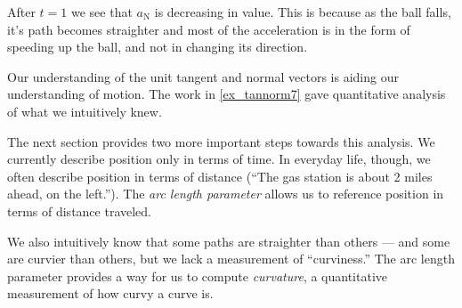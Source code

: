 \begin{example}
After $t=1$ we see that $a_\mathrm{N}$ is decreasing in value. This is because as the ball falls, it's path becomes straighter and most of the acceleration is in the form of speeding up the ball, and not in changing its direction.
\end{example}

Our understanding of the unit tangent and normal vectors is aiding our understanding of motion. The work in \autoref{ex_tannorm7} gave quantitative analysis of what we intuitively knew.

The next section provides two more important steps towards this analysis. %
We currently describe position only in terms of time. In everyday life, though, we often describe position in terms of distance (``The gas station is about 2 miles ahead, on the left.''). The \emph{arc length parameter} allows us to reference position in terms of distance traveled. 

We also intuitively know that some paths are straighter than others --- and some are curvier than others, but we lack a measurement of ``curviness.'' The arc length parameter provides a way for us to compute \emph{curvature}, a quantitative measurement of how curvy a curve is.

